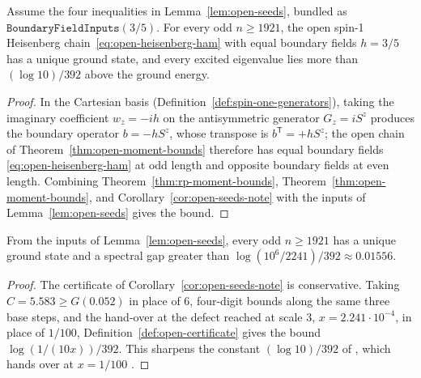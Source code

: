 \begin{theorem}
  \label{thm:boundary-field-gap}
  \leanok
  Assume the four inequalities in Lemma~\ref{lem:open-seeds},
  bundled as \(\texttt{BoundaryFieldInputs}(3/5)\).
  For every odd \(n \ge 1921\), the open spin-1 Heisenberg chain~\eqref{eq:open-heisenberg-ham} with
  equal boundary fields \(h = 3/5\) has a unique ground state, and every excited eigenvalue lies
  more than \((\log 10)/392\) above the ground energy.
\end{theorem}
\begin{proof}
  \leanok
  In the Cartesian basis (Definition~\ref{def:spin-one-generators}), taking the imaginary
  coefficient \(w_z = -ih\) on the antisymmetric generator \(G_z = i S^z\) produces the boundary
  operator \(b = -h S^z\), whose transpose is \(b^{\mathsf T} = +h S^z\); the open chain of
  Theorem~\ref{thm:open-moment-bounds} therefore has equal boundary fields
  \eqref{eq:open-heisenberg-ham} at odd length and opposite boundary fields at even length.
  Combining Theorem~\ref{thm:rp-moment-bounds}, Theorem~\ref{thm:open-moment-bounds}, and
  Corollary~\ref{cor:open-seeds-note} with the inputs of Lemma~\ref{lem:open-seeds} gives the
  bound.
\end{proof}

\begin{theorem}
  \label{thm:boundary-field-gap-sharp}
  \leanok
  From the inputs of Lemma~\ref{lem:open-seeds}, every odd \(n \ge 1921\) has a unique ground state
  and a spectral gap greater than \(\log(10^6/2241)/392 \approx 0.01556\).
\end{theorem}
\begin{proof}
  \leanok
  The certificate of Corollary~\ref{cor:open-seeds-note} is conservative. Taking
  \(C = 5.583 \ge G(0.052)\) in place of \(6\), four-digit bounds along the same three base steps,
  and the hand-over at the defect reached at scale \(3\), \(x = 2.241 \cdot 10^{-4}\), in place of
  \(1/100\), Definition~\ref{def:open-certificate} gives the bound \(\log(1/(10x))/392\).
  This sharpens the constant \((\log 10)/392\) of \cite[Theorem 1.1]{OpenAIBoundary}, which
  hands over at \(x = 1/100\) \cite[Sections 5.3 and 6]{OpenAIBoundary}.
\end{proof}



